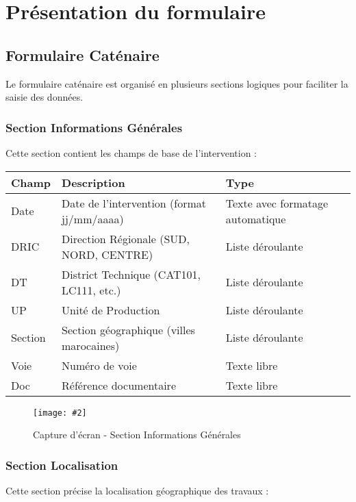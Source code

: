 \documentclass[12pt,a4paper]{report}
\newcommand{\screenshot}[3][]{%
\begin{figure}[H]
\centering
\texttt{[image: \#2]}
\caption{#3}
\end{figure}
}
\begin{document}
\chapter{Présentation du formulaire}

\section{Formulaire Caténaire}

Le formulaire caténaire est organisé en plusieurs sections logiques pour faciliter la saisie des données.

\subsection{Section Informations Générales}

Cette section contient les champs de base de l'intervention :

\begin{table}[H]
\centering
\begin{tabular}{|p{3cm}|p{8cm}|p{3cm}|}
\hline
\textbf{Champ} & \textbf{Description} & \textbf{Type} \\
\hline
Date & Date de l'intervention (format jj/mm/aaaa) & Texte avec formatage automatique \\
\hline
DRIC & Direction Régionale (SUD, NORD, CENTRE) & Liste déroulante \\
\hline
DT & District Technique (CAT101, LC111, etc.) & Liste déroulante \\
\hline
UP & Unité de Production & Liste déroulante \\
\hline
Section & Section géographique (villes marocaines) & Liste déroulante \\
\hline
Voie & Numéro de voie & Texte libre \\
\hline
Doc & Référence documentaire & Texte libre \\
\hline
\end{tabular}
\end{table}

\screenshot{for_cat.png}{Capture d'écran - Section Informations Générales}

\subsection{Section Localisation}

Cette section précise la localisation géographique des travaux :
\end{document}
